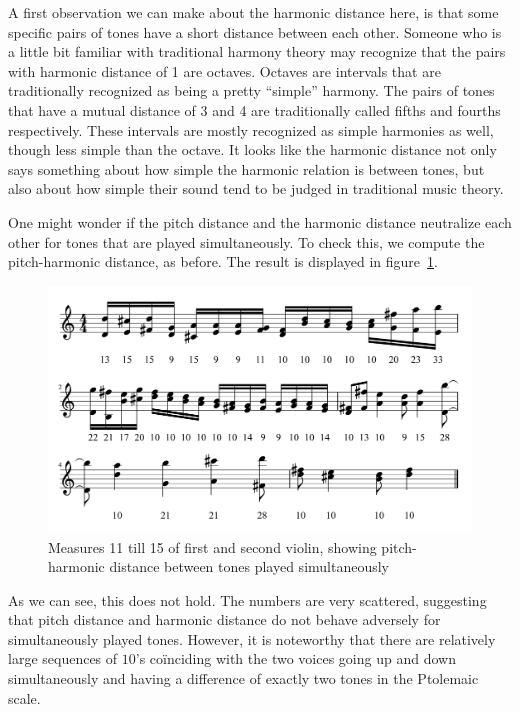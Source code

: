 \documentclass[a4paper]{book}
\theoremstyle{definition}
\begin{document}
A first observation we can make about the harmonic distance here, is that some specific pairs of tones have a short distance between each other.
Someone who is a little bit familiar with traditional harmony theory may recognize that the pairs with harmonic distance of 1 are octaves.
Octaves are intervals that are traditionally recognized as being a pretty ``simple'' harmony.
The pairs of tones that have a mutual distance of 3 and 4 are traditionally called fifths and fourths respectively.
These intervals are mostly recognized as simple harmonies as well, though less simple than the octave.
It looks like the harmonic distance not only says something about how simple the harmonic relation is between tones, but also about how simple their sound tend to be judged in traditional music theory.

One might wonder if the pitch distance and the harmonic distance neutralize each other for tones that are played simultaneously.
To check this, we compute the pitch-harmonic distance, as before.
The result is displayed in figure~\ref{fig_first_second_violin_melodic_harmonic_distance_self}.

\begin{figure}[H]
    \centering
    \includegraphics[scale=0.25]{figures/fig_first_second_violin_melodic_harmonic_distance_self.png}
    \caption{Measures 11 till 15 of first and second violin, showing pitch-harmonic distance between tones played simultaneously}
    \label{fig_first_second_violin_melodic_harmonic_distance_self}
\end{figure}

As we can see, this does not hold.
The numbers are very scattered, suggesting that pitch distance and harmonic distance do not behave adversely for simultaneously played tones.
However, it is noteworthy that there are relatively large sequences of $10$'s co\"inciding with the two voices going up and down simultaneously and having a difference of exactly two tones in the Ptolemaic scale.
\end{document}
